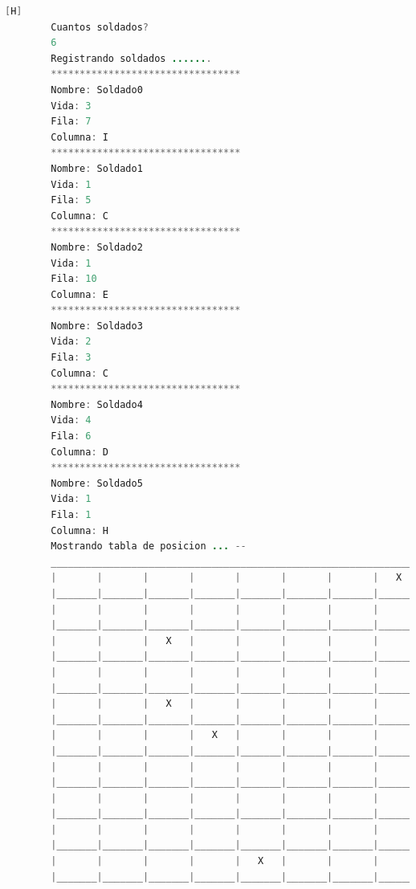 \documentclass{article}
\begin{document}
	\begin{lstlisting}[language=java,caption={Las lineas de codigos del metodo creado: \textcolor{red}{VER EL TEXTO EN LATEX EN LA IMAGEN SE DEFORMA O EJECUTARLO}}][H]
		Cuantos soldados? 
		6
		Registrando soldados .......
		*********************************
		Nombre: Soldado0
		Vida: 3
		Fila: 7
		Columna: I
		*********************************
		Nombre: Soldado1
		Vida: 1
		Fila: 5
		Columna: C
		*********************************
		Nombre: Soldado2
		Vida: 1
		Fila: 10
		Columna: E
		*********************************
		Nombre: Soldado3
		Vida: 2
		Fila: 3
		Columna: C
		*********************************
		Nombre: Soldado4
		Vida: 4
		Fila: 6
		Columna: D
		*********************************
		Nombre: Soldado5
		Vida: 1
		Fila: 1
		Columna: H
		Mostrando tabla de posicion ... --
		_________________________________________________________________________________
		|       |       |       |       |       |       |       |   X   |       |       |
		|_______|_______|_______|_______|_______|_______|_______|_______|_______|_______|
		|       |       |       |       |       |       |       |       |       |       |
		|_______|_______|_______|_______|_______|_______|_______|_______|_______|_______|
		|       |       |   X   |       |       |       |       |       |       |       |
		|_______|_______|_______|_______|_______|_______|_______|_______|_______|_______|
		|       |       |       |       |       |       |       |       |       |       |
		|_______|_______|_______|_______|_______|_______|_______|_______|_______|_______|
		|       |       |   X   |       |       |       |       |       |       |       |
		|_______|_______|_______|_______|_______|_______|_______|_______|_______|_______|
		|       |       |       |   X   |       |       |       |       |       |       |
		|_______|_______|_______|_______|_______|_______|_______|_______|_______|_______|
		|       |       |       |       |       |       |       |       |   X   |       |
		|_______|_______|_______|_______|_______|_______|_______|_______|_______|_______|
		|       |       |       |       |       |       |       |       |       |       |
		|_______|_______|_______|_______|_______|_______|_______|_______|_______|_______|
		|       |       |       |       |       |       |       |       |       |       |
		|_______|_______|_______|_______|_______|_______|_______|_______|_______|_______|
		|       |       |       |       |   X   |       |       |       |       |       |
		|_______|_______|_______|_______|_______|_______|_______|_______|_______|_______|


\end{lstlisting}
\end{document}
